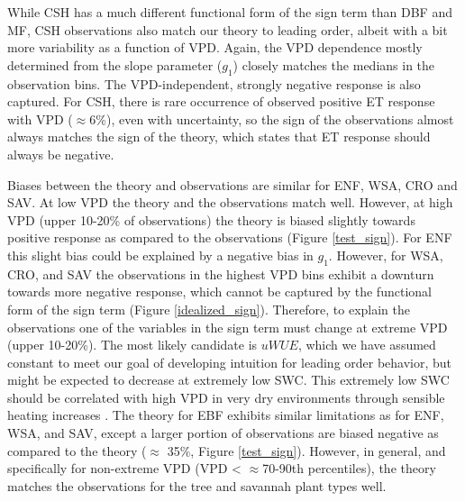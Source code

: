 \documentclass[draft,linenumbers]{afmjournal}
\begin{document}
While CSH has a much different functional form of the sign term than
DBF and MF, CSH observations also match our theory to leading order,
albeit with a bit more variability as a function of VPD. Again, the
VPD dependence mostly determined from the slope parameter ($g_1$)
closely matches the medians in the observation bins. The
VPD-independent, strongly negative response is also captured. For CSH,
there is rare occurrence of observed positive ET response with VPD
($\approx 6$\%), even with uncertainty, so the sign of the
observations almost always matches the sign of the theory, which
states that ET response should always be negative.

Biases between the theory and observations are similar for ENF, WSA,
CRO and SAV. At low VPD the theory and the observations match
well. However, at high VPD (upper 10-20\% of observations) the theory
is biased slightly towards positive response as compared to the
observations (Figure \ref{test_sign}). For ENF this slight bias could
be explained by a negative bias in $g_1$. However, for WSA, CRO, and
SAV the observations in the highest VPD bins exhibit a downturn
towards more negative response, which cannot be captured by the
functional form of the sign term (Figure
\ref{idealized_sign}). Therefore, to explain the observations one of
the variables in the sign term must change at extreme VPD (upper
10-20\%). The most likely candidate is $uWUE$, which we have assumed
constant to meet our goal of developing intuition for leading order
behavior, but might be expected to decrease at extremely low SWC. This extremely low SWC should be correlated with high VPD in very dry environments
through sensible heating increases \citep{Gentine_2016}. The theory
for EBF exhibits similar limitations as for ENF, WSA, and SAV, except
a larger portion of observations are biased negative as compared to
the theory ($\approx$ 35\%, Figure \ref{test_sign}). However, in
general, and specifically for non-extreme VPD (VPD < $\approx$70-90th
percentiles), the theory matches the observations for the tree and
savannah plant types well.
\end{document}
